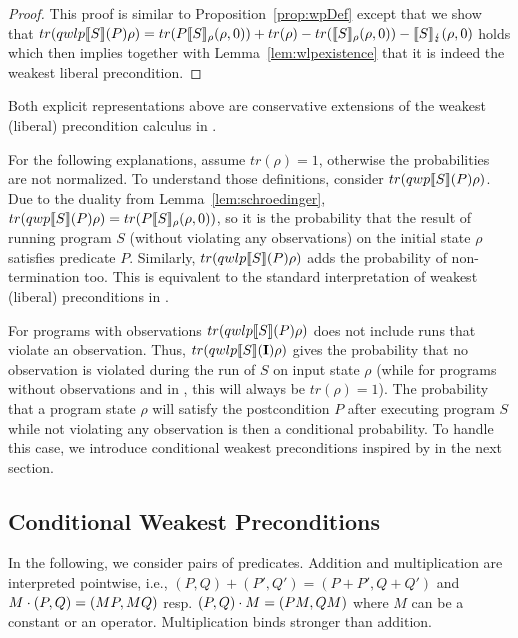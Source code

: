 \documentclass[a4paper,UKenglish,cleveref, autoref, thm-restate]{lipics-v2021}
\begin{document}
\begin{proof} This proof is similar to Proposition~\ref{prop:wpDef} except that we show that $tr(qwlp\llbracket S \rrbracket (P)\rho) = tr(P\llbracket S \rrbracket_{\rho}(\rho,0)) + tr(\rho)-tr(\llbracket S \rrbracket_{\rho}(\rho,0))- \llbracket S \rrbracket_{\lightning}(\rho,0)$ holds which then implies together with Lemma~\ref{lem:wlpexistence} that it is indeed the weakest liberal precondition.
\end{proof}
Both explicit representations above are conservative extensions of the weakest (liberal) precondition calculus in \cite{floydHoareLogic}.

For the following explanations, assume $tr(\rho)=1$, otherwise the probabilities are not normalized. To understand those definitions, consider $tr(qwp\llbracket S \rrbracket (P) \rho)$.  Due to the duality from Lemma~\ref{lem:schroedinger}, $tr(qwp\llbracket S \rrbracket (P)\rho) = tr(P\llbracket S \rrbracket_{\rho}(\rho,0))$, so it is the probability that the result of running program $S$ (without violating any observations) on the initial state $\rho$ satisfies predicate $P$. Similarly, $tr(qwlp\llbracket S \rrbracket (P)\rho)$ adds the probability of non-termination too. This is equivalent to the standard interpretation of weakest (liberal) preconditions in \cite{floydHoareLogic}.

For programs with observations $tr(qwlp\llbracket S \rrbracket (P)\rho)$ does not include runs that violate an observation. Thus, $tr(qwlp\llbracket S \rrbracket (\textbf{I}) \rho)$ gives the probability that no observation is violated during the run of $S$ on input state $\rho$ (while for programs without observations and in \cite{floydHoareLogic}, this will always be $tr(\rho)=1$). The probability that a program state $\rho$ will satisfy the postcondition $P$ after executing program $S$ while not violating any observation is then a conditional probability. To handle this case, we introduce conditional weakest preconditions inspired by \cite{conditioningProb} in the next section.

\subsection{Conditional Weakest Preconditions}
In the following, we consider pairs of predicates. Addition and multiplication are interpreted pointwise, i.e., $(P,Q) + (P',Q') = (P+P',Q+Q')$ and $M \cdot (P,Q) = (MP,MQ)$ resp. $(P,Q) \cdot M = (PM,QM)$ where $M$ can be a constant or an operator. Multiplication binds stronger than addition.
\end{document}
